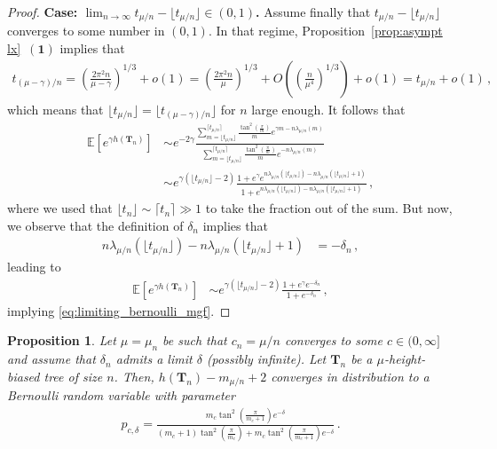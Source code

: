 \documentclass{article}
\newcommand{\E}{\mathbb{E}}								%
\newcommand{\1}{\mathbbm{1}}								%
\newtheorem{proposition}[theorem]{Proposition}
\theoremstyle{definition}
\numberwithin{equation}{section}
\newcommand{\bT}{\mathbf T}
\newcommand{\numitem}[1]{$\mathbf{(#1)}$}
\begin{document}
\begin{proof}
    \noindent \textbf{Case: $\lim_{n \to \infty} t_{\mu/n}-\lfloor t_{\mu/n} \rfloor \in (0,1)$.} Assume finally that $t_{\mu/n}-\lfloor t_{\mu/n}\rfloor$ converges to some number in $(0,1)$.
    In that regime, Proposition~\ref{prop:asympt lx}~\numitem{1} implies that
    \begin{align*}
        t_{(\mu-\gamma)/n}=\left(\frac{2\pi^2n}{\mu-\gamma}\right)^{1/3}+o(1)=\left(\frac{2\pi^2n}{\mu}\right)^{1/3}+O\left(\left(\frac{n}{\mu^4}\right)^{1/3}\right)+o(1)=t_{\mu/n}+o(1)\,,
    \end{align*}
    which means that $\lfloor t_{\mu/n}\rfloor=\lfloor t_{(\mu-\gamma)/n}\rfloor$ for $n$ large enough.
    It follows that
    \begin{align*}
        \E\left[e^{\gamma h(\bT_n)}\right]&\sim e^{-2\gamma}\frac{\sum_{m=\lfloor t_{\mu/n}\rfloor}^{\lceil t_{\mu/n}\rceil}\frac{\tan^2\left(\frac{\pi}{m}\right)}{m}e^{\gamma m-n\lambda_{\mu/n}(m)}}{\sum_{m=\lfloor t_{\mu/n}\rfloor}^{\lceil t_{\mu/n}\rceil}\frac{\tan^2\left(\frac{\pi}{m}\right)}{m}e^{-n\lambda_{\mu/n}(m)}}\\
        &\sim e^{\gamma\left(\lfloor t_{\mu/n}\rfloor-2\right)}\frac{1+e^{\gamma}e^{n\lambda_{\mu/n}(\lfloor t_{\mu/n}\rfloor)-n\lambda_{\mu/n}(\lfloor t_{\mu/n}\rfloor+1)}}{1+e^{n\lambda_{\mu/n}(\lfloor t_{\mu/n}\rfloor)-n\lambda_{\mu/n}(\lfloor t_{\mu/n}\rfloor+1)}}\,,
    \end{align*}
    where we used that $\lfloor t_n\rfloor\sim\lceil t_n\rceil\gg1$ to take the fraction out of the sum.
    But now, we observe that the definition of $\delta_n$ implies that
    \begin{align*}
        n\lambda_{\mu/n}(\lfloor t_{\mu/n}\rfloor)-n\lambda_{\mu/n}(\lfloor t_{\mu/n}\rfloor+1)&=-\delta_n\,,
    \end{align*}
    leading to
    \begin{align*}
        \E\left[e^{\gamma h(\bT_n)}\right]&\sim e^{\gamma\left(\lfloor t_{\mu/n}\rfloor-2\right)}\frac{1+e^{\gamma}e^{-\delta_n}}{1+e^{-\delta_n}}\,,
    \end{align*}
    implying \eqref{eq:limiting_bernoulli_mgf}.
\end{proof}

\begin{proposition}\label{prop:high lln}
    Let $\mu=\mu_n$ be such that $c_n=\mu/n$ converges to some $c\in(0,\infty]$ and assume that $\delta_n$ admits a limit $\delta$ (possibly infinite).
    Let $\mathbf{T}_n$ be a $\mu$-height-biased tree of size $n$.
    Then, $h(\bT_n)-m_{\mu/n}+2$ converges in distribution to a Bernoulli random variable with parameter
    \begin{align*}
        p_{c,\delta}=\frac{m_c\tan^2\left(\frac{\pi}{m_c+1}\right)e^{-\delta}}{(m_c+1)\tan^2\left(\frac{\pi}{m_c}\right)+m_c\tan^2\left(\frac{\pi}{m_c+1}\right)e^{-\delta}}\,.
    \end{align*}
\end{proposition}
\end{document}
